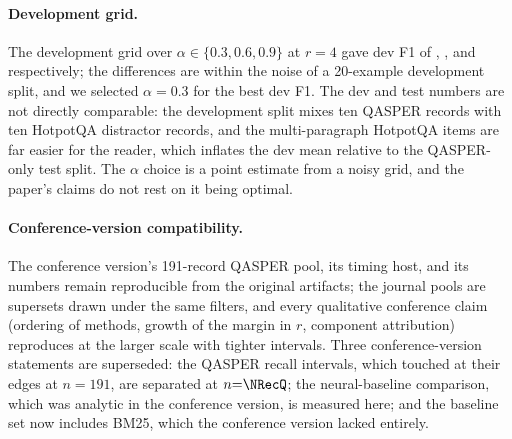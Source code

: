 \documentclass[review,12pt]{elsarticle}
\theoremstyle{remark}
\begin{document}
\paragraph{Development grid.}
The development grid over $\alpha \in \{0.3, 0.6, 0.9\}$ at $r=4$
gave dev F1 of \GridALo, \GridAMid, and \GridAHi{} respectively; the
differences are within the noise of a 20-example development split,
and we selected $\alpha=0.3$ for the best dev F1. The dev and test
numbers are not directly comparable: the development split mixes ten
QASPER records with ten HotpotQA distractor records, and the
multi-paragraph HotpotQA items are far easier for the reader, which
inflates the dev mean relative to the QASPER-only test split. The
$\alpha$ choice is a point estimate from a noisy grid, and the
paper's claims do not rest on it being optimal.

\paragraph{Conference-version compatibility.}
The conference version's 191-record QASPER pool, its timing host, and
its numbers remain reproducible from the original artifacts; the
journal pools are supersets drawn under the same filters, and every
qualitative conference claim (ordering of methods, growth of the
margin in $r$, component attribution) reproduces at the larger scale
with tighter intervals. Three conference-version statements are
superseded: the QASPER recall intervals, which touched at their edges
at $n=191$, are separated at $n{=}\NRecQ$; the neural-baseline
comparison, which was analytic in the conference version, is measured
here; and the baseline set now includes BM25, which the conference
version lacked entirely.
\end{document}
